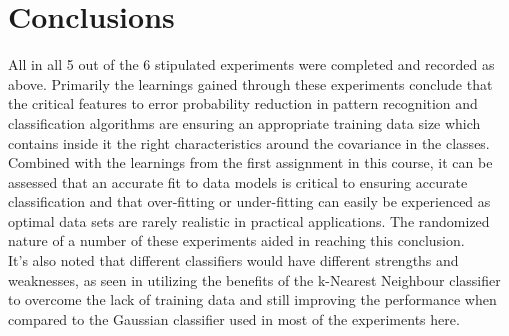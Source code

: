 \section{Conclusions}

All in all 5 out of the 6 stipulated experiments were completed and recorded as above. Primarily the learnings gained through these experiments conclude that the critical features to error probability reduction in pattern recognition and classification algorithms are ensuring an appropriate training data size which contains inside it the right characteristics around the covariance in the classes. Combined with the learnings from the first assignment in this course, it can be assessed that an accurate fit to data models is critical to ensuring accurate classification and that over-fitting or under-fitting can easily be experienced as optimal data sets are rarely realistic in practical applications. The randomized nature of a number of these experiments aided in reaching this conclusion.\\

It's also noted that different classifiers would have different strengths and weaknesses, as seen in utilizing the benefits of the k-Nearest Neighbour classifier to overcome the lack of training data and still improving the performance when compared to the Gaussian classifier used in most of the experiments here.

